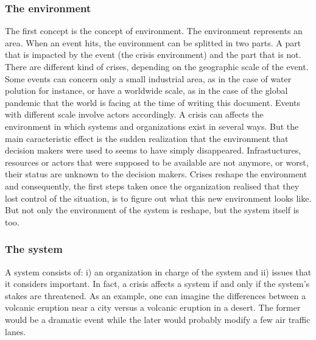 \subsubsection{The environment}
The first concept is the concept of environment.
The environment represents an area.
When an event hits, the environment can be splitted in two parts.
A part that is impacted by the event (the crisis environment) and the part that is not.
There are different kind of crises, depending on the geographic scale of the event.
Some events can concern only a small industrial area, as in the case of water polution for instance, or have a worldwide scale, as in the case of the global pandemic that the world is facing at the time of writing this document.
Events with different scale involve actors accordingly.
A crisis can affects the environment in which systems and organizations exist in several ways.
But the main caracteristic effect is the sudden realization that the environment that decision makers were used to seems to have simply disappeared.
Infrastuctures, resources or actors that were supposed to be available are not anymore, or worst, their status are unknown to the decision makers.
Crises reshape the environment and consequently, the first steps taken once the organization realised that they lost control of the situation, is to figure out what this new environment looks like.
But not only the environment of the system is reshape, but the system itself is too.

\subsubsection{The system}
A system consists of: i) an organization in charge of the system and ii) issues that it considers important.
In fact, a crisis affects a system if and only if the system's stakes are threatened.
As an example, one can imagine the differences between a volcanic eruption near a city versus a volcanic eruption in a desert.
The former would be a dramatic event while the later would probably modify a few air traffic lanes.

